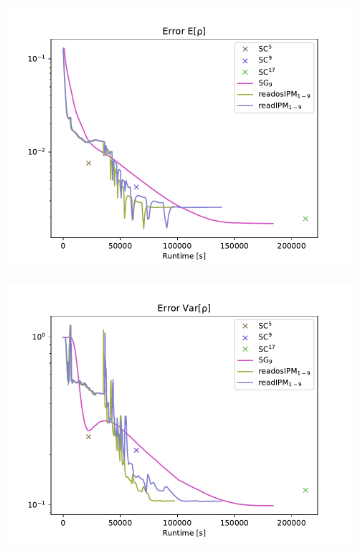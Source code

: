 \begin{figure}[h!]
\centering
	\begin{subfigure}{0.5\linewidth}
		\centering
				\includegraphics[scale=0.5]{figs/Euler2D/L2_error_E[rho].pdf}
		\label{fig:sub1}
	\end{subfigure}%
	\begin{subfigure}{0.5\linewidth}
		\centering
				\includegraphics[scale=0.5]{figs/Euler2D/L2_error_Var[rho].pdf}
		\label{fig:sub2}
	\end{subfigure}
	

\end{figure}

